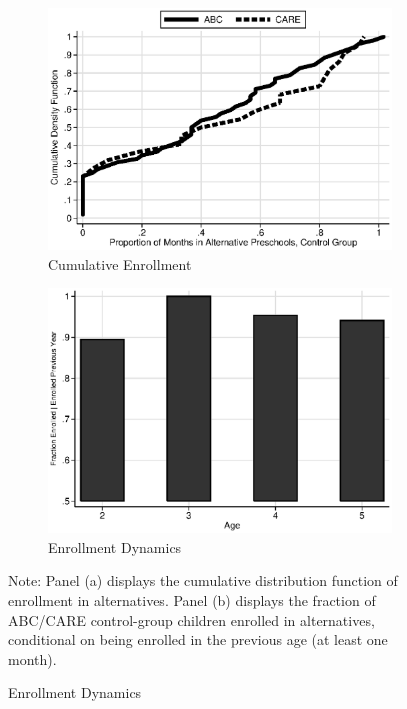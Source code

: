 \begin{figure}
\centering
\caption{Control Substitution Characteristics, ABC/CARE Control Group}\label{fig:control-sub}
\begin{subfigure}[h]{0.49\textwidth}
	\centering
	\caption{Cumulative Enrollment} \label{fig:treatsubcare}
	\includegraphics[width=\textwidth]{output/abccare_controlcontamination.eps}
\end{subfigure}
\begin{subfigure}[h]{0.49\textwidth}
	\centering
	\caption{Enrollment Dynamics} \label{fig:proportion-alt-pre}
	\includegraphics[width=\textwidth]{output/abccare_Vprobs.eps}
\end{subfigure}%
\footnotesize \justify
Note: Panel (a) displays the cumulative distribution function of enrollment in alternatives. Panel (b) displays the fraction of ABC/CARE control-group children enrolled in alternatives, conditional on being enrolled in the previous age (at least one month).\\
\end{figure}

